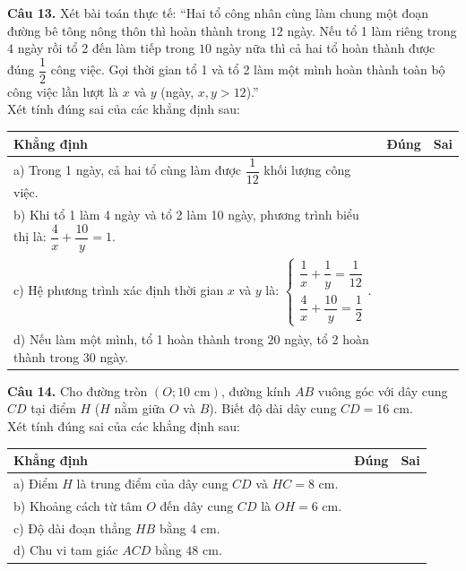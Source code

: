 \documentclass[11pt,a4paper]{article}
\begin{document}
\vspace{1.5mm}
\textbf{Câu 13.} Xét bài toán thực tế: ``Hai tổ công nhân cùng làm chung một đoạn đường bê tông nông thôn thì hoàn thành trong $12$ ngày. Nếu tổ 1 làm riêng trong $4$ ngày rồi tổ 2 đến làm tiếp trong $10$ ngày nữa thì cả hai tổ hoàn thành được đúng $\dfrac{1}{2}$ công việc. Gọi thời gian tổ 1 và tổ 2 làm một mình hoàn thành toàn bộ công việc lần lượt là $x$ và $y$ (ngày, $x, y > 12$).''\\
Xét tính đúng sai của các khẳng định sau:
\begin{center}
\begin{tabularx}{\linewidth}{|X|c|c|}
\hline
\textbf{Khẳng định} & \textbf{Đúng} & \textbf{Sai} \\
\hline
a) Trong 1 ngày, cả hai tổ cùng làm được $\dfrac{1}{12}$ khối lượng công việc. & & \\
\hline
b) Khi tổ 1 làm 4 ngày và tổ 2 làm 10 ngày, phương trình biểu thị là: $\dfrac{4}{x} + \dfrac{10}{y} = 1$. & & \\
\hline
c) Hệ phương trình xác định thời gian $x$ và $y$ là: $\begin{cases} \dfrac{1}{x} + \dfrac{1}{y} = \dfrac{1}{12} \\ \dfrac{4}{x} + \dfrac{10}{y} = \dfrac{1}{2} \end{cases}$. & & \\
\hline
d) Nếu làm một mình, tổ 1 hoàn thành trong $20$ ngày, tổ 2 hoàn thành trong $30$ ngày. & & \\
\hline
\end{tabularx}
\end{center}

\vspace{2mm}
\textbf{Câu 14.} Cho đường tròn $(O; 10\text{ cm})$, đường kính $AB$ vuông góc với dây cung $CD$ tại điểm $H$ ($H$ nằm giữa $O$ và $B$). Biết độ dài dây cung $CD = 16\text{ cm}$.\\
Xét tính đúng sai của các khẳng định sau:
\begin{center}
\begin{tabularx}{\linewidth}{|X|c|c|}
\hline
\textbf{Khẳng định} & \textbf{Đúng} & \textbf{Sai} \\
\hline
a) Điểm $H$ là trung điểm của dây cung $CD$ và $HC = 8\text{ cm}$. & & \\
\hline
b) Khoảng cách từ tâm $O$ đến dây cung $CD$ là $OH = 6\text{ cm}$. & & \\
\hline
c) Độ dài đoạn thẳng $HB$ bằng $4\text{ cm}$. & & \\
\hline
d) Chu vi tam giác $ACD$ bằng $48\text{ cm}$. & & \\
\hline
\end{tabularx}
\end{center}
\end{document}
